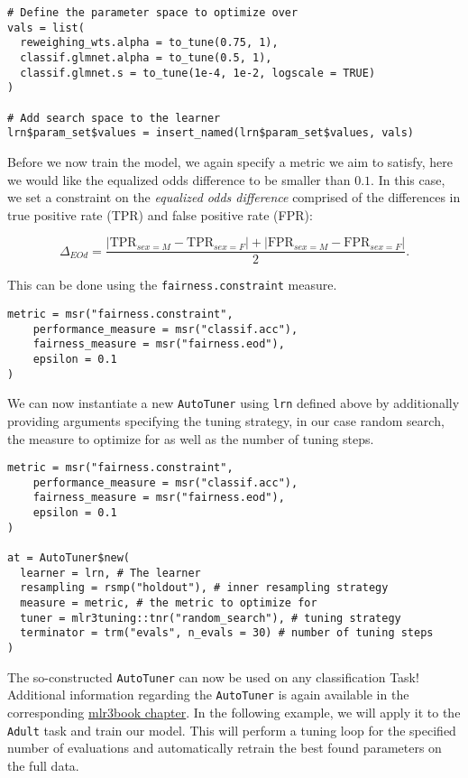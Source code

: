 \begin{verbatim}
# Define the parameter space to optimize over
vals = list(
  reweighing_wts.alpha = to_tune(0.75, 1),
  classif.glmnet.alpha = to_tune(0.5, 1),
  classif.glmnet.s = to_tune(1e-4, 1e-2, logscale = TRUE)
)

# Add search space to the learner
lrn$param_set$values = insert_named(lrn$param_set$values, vals)
\end{verbatim}

Before we now train the model, we again specify a metric we aim to satisfy, here we would like the equalized odds difference to be smaller than \(0.1\).
In this case, we set a constraint on the \emph{equalized odds difference} comprised of the differences in true positive rate (TPR) and false positive rate (FPR):

\[
\Delta_{EOd} = \frac{|\textrm{TPR}_{sex = M} - \textrm{TPR}_{sex = F}| + |\textrm{FPR}_{sex = M} - \textrm{FPR}_{sex = F}|}{2}.
\]

This can be done using the \texttt{fairness.constraint} measure.

\begin{verbatim}
metric = msr("fairness.constraint",
    performance_measure = msr("classif.acc"),
    fairness_measure = msr("fairness.eod"),
    epsilon = 0.1
)
\end{verbatim}

We can now instantiate a new \texttt{AutoTuner} using \texttt{lrn} defined above by additionally providing arguments specifying the tuning strategy, in our case random search, the measure to optimize for as well as the number of tuning steps.

\begin{verbatim}
metric = msr("fairness.constraint",
    performance_measure = msr("classif.acc"),
    fairness_measure = msr("fairness.eod"),
    epsilon = 0.1
)

at = AutoTuner$new(
  learner = lrn, # The learner
  resampling = rsmp("holdout"), # inner resampling strategy
  measure = metric, # the metric to optimize for
  tuner = mlr3tuning::tnr("random_search"), # tuning strategy
  terminator = trm("evals", n_evals = 30) # number of tuning steps
)
\end{verbatim}

The so-constructed \texttt{AutoTuner} can now be used on any classification Task!
Additional information regarding the \texttt{AutoTuner} is again available in the corresponding \href{https://mlr3book.mlr-org.com/optimization.html\#autotuner}{mlr3book chapter}.
In the following example, we will apply it to the \texttt{Adult} task and train our model.
This will perform a tuning loop for the specified number of evaluations and
automatically retrain the best found parameters on the full data.

